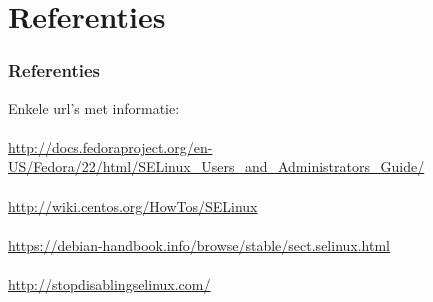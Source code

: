 \section{Referenties}
\begin{frame}
    \frametitle{Referenties}
Enkele url's met informatie: \\
~\\
\footnotesize
\url{http://docs.fedoraproject.org/en-US/Fedora/22/html/SELinux\_Users\_and\_Administrators\_Guide/}
~\\
~\\
\url{http://wiki.centos.org/HowTos/SELinux}
~\\
~\\
\url{https://debian-handbook.info/browse/stable/sect.selinux.html}
~\\
~\\
\url{http://stopdisablingselinux.com/}
\end{frame}
